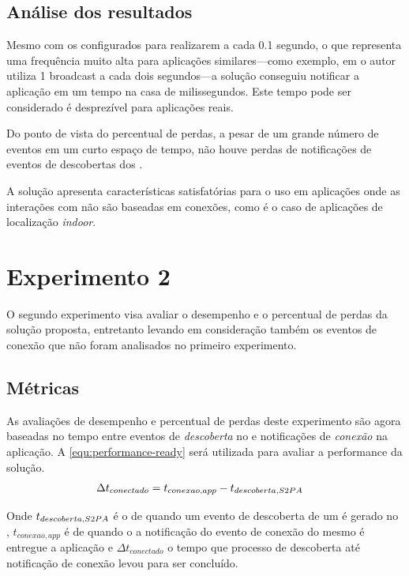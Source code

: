 \subsection{Análise dos resultados}

Mesmo com os \beacons configurados para realizarem \broadcast a cada 0.1 segundo, o que representa uma frequência muito alta para aplicações similares---como exemplo, em  o autor utiliza 1 broadcast a cada dois segundos---a solução conseguiu notificar a aplicação em um tempo na casa de milissegundos.  
Este tempo pode ser considerado é desprezível para aplicações reais.

Do ponto de vista do percentual de perdas, a pesar de um grande número de eventos em um curto espaço de tempo, não houve perdas de notificações de eventos de descobertas dos \beacons.

A solução apresenta características satisfatórias para o uso em aplicações onde as interações com \smartobjs não são baseadas em conexões, como é o caso de aplicações de localização \textit{indoor}.

\section{Experimento 2}

O segundo experimento visa avaliar o desempenho e o percentual de perdas da solução proposta, entretanto levando em consideração também os eventos de conexão que não foram analisados no primeiro experimento.

\subsection{Métricas}

As avaliações de desempenho e percentual de perdas deste experimento são agora baseadas no tempo entre eventos de \emph{descoberta} no \stwopa e notificações de \emph{conexão} na aplicação.  
A \autoref{equ:performance-ready} será utilizada para avaliar a performance da solução.
\begin{align}
	\label{equ:performance-ready}
	\Delta t_{conectado} &= t_{conexao,app} - t_{descoberta,S2PA}
\end{align}

Onde $t_{descoberta,S2PA}$ é o \timestamp de quando um evento de descoberta de um \smartobj é gerado no \stwopa, $t_{conexao,app}$ é \timestamp de quando o a notificação do evento de conexão do mesmo \smartobj é entregue a aplicação e $\Delta t_{conectado}$ o tempo que processo de descoberta até notificação de conexão levou para ser concluído.

